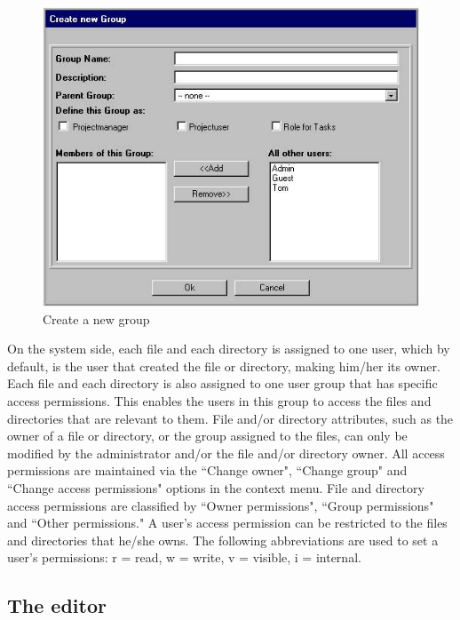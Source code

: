 \begin{figure}[!hbt]
\begin{center}
\includegraphics[width=\sgw]
                   {pics/usermanual/newGroup}
\caption[Create a new group]
           {Create a new group}
\label{newgroup}
\end{center}
\end{figure}

On the system side, each file and each directory is assigned to
one user, which by default, is the user that created the file or
directory, making him/her its owner. Each file and each directory
is also assigned to one user group that has specific access
permissions. This enables the users in this group to access the
files and directories that are relevant to them. File and/or
directory attributes, such as the owner of a file or directory, or
the group assigned to the files, can only be modified by the
administrator and/or the file and/or directory owner. All access
permissions are maintained via the ``Change owner", ``Change group"
and ``Change access permissions" options in the context
menu. File and directory access permissions are classified by
``Owner permissions", ``Group permissions" and ``Other permissions." A
user's access permission can be restricted to the files and
directories that he/she owns. The following abbreviations are used
to set a user's permissions: r = read, w = write, v = visible, i =
internal.

\subsection{The editor}

